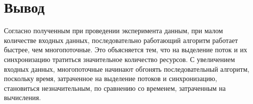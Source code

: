 \section*{Вывод}

Согласно полученным при проведении эксперимента данным, при малом количестве входных данных, последовательно работающий алгоритм работает быстрее, чем многопоточные. 
Это объясняется тем, что на выделение поток и их синхронизацию тратиться значительное количество ресурсов.
С увеличением входных данных, многопоточные начинают обгонять последовательный алгоритм, поскольку время, затраченное на выделение потоков и синхронизацию, становиться незначительным, по сравнению со временем, затраченным на вычисления.